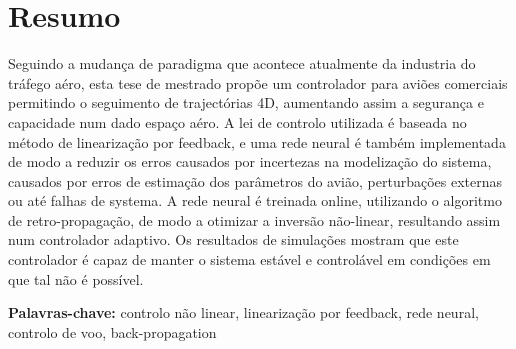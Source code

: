 
\section*{Resumo}


Seguindo a mudança de paradigma que acontece atualmente da industria do tráfego aéro, esta tese de mestrado propõe um controlador para aviões comerciais permitindo o seguimento de trajectórias 4D, aumentando assim a segurança e capacidade num dado espaço aéro. A lei de controlo utilizada é baseada no método de linearização por feedback, e uma rede neural é também implementada de modo a reduzir os erros causados por incertezas na modelização do sistema, causados por erros de estimação dos parâmetros do avião, perturbações externas ou até falhas de systema. A rede neural é treinada online, utilizando o algoritmo de retro-propagação, de modo a otimizar a inversão não-linear, resultando assim num controlador adaptivo. Os resultados de simulações mostram que este controlador é capaz de manter o sistema estável e controlável em condições em que tal não é possível.

\vfill

\textbf{\Large Palavras-chave:} controlo não linear, linearização por feedback, rede neural, controlo de voo, back-propagation

